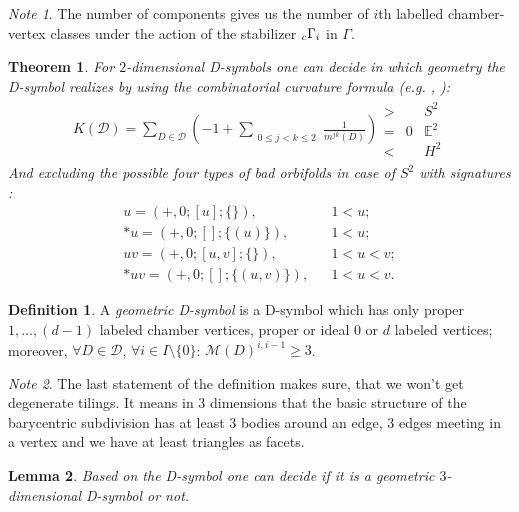 \documentclass[12pt,a4paper]{article}
\numberwithin{equation}{section}
\newcommand{\leftsub}[2]{{\vphantom{#2}}_{#1}{#2}}
\theoremstyle{plain}%
\newtheorem{thm}{Theorem}[section]
\newtheorem{lem}[thm]{Lemma}
\theoremstyle{definition}
\newtheorem{defn}{Definition}[section]
\theoremstyle{remark}
\newtheorem*{note}{Note}
\begin{document}
\begin{note}
  The number of components gives us the number of $i$th labelled chamber-vertex
  classes under the action of the stabilizer $\leftsub{c}{\Gamma}_i$ in $\Gamma$.
\end{note}

\begin{thm}
  \label{thm:curvature}
  For $2$-dimensional D-symbols one can decide in which geometry the
  D-symbol realizes by using the {\em combinatorial curvature formula}
  (e.g. \cite{M96}, \cite{LMS94}):
  \begin{align*}
    K(\mathcal{D})=\sum_{D\in
    \mathcal{D}}\left(-1+\sum_{\substack{0\le j<k\le 2}}\frac{1}{m^{jk}(D)}\right)
    \begin{array}{cccc}
      > & & S^2 \\
      = & 0 & \mathbb{E}^2 \\
      < & & H^2
    \end{array}
  \end{align*}
  And excluding the possible four types of bad orbifolds in case of $S^2$ with 
  signatures \cite{Ma67}:
  \begin{align*}
    u=(+,0;[u];\{\}), & & 1<u;\\
    *u=(+,0;[];\{(u)\}), & & 1<u;\\
    uv=(+,0;[u,v];\{\}), & & 1<u<v;\\
    *uv=(+,0;[];\{(u,v)\}), & & 1<u<v.
  \end{align*}
\end{thm}

\begin{defn}
  \label{def:D-sym}
  A {\em geometric D-symbol} is a D-symbol which
  has only proper $1,\ldots,(d-1)$ labeled chamber vertices, proper or ideal $0$ or
  $d$ labeled vertices; moreover, $\forall D\in \mathcal{D}$, $\forall i\in
  I\setminus\{0\}$: $\mathcal{M}(D)^{i,i-1}\geq3$.
\end{defn}

\begin{note}
  The last statement of the definition makes sure, that we won't get degenerate
  tilings. It means in $3$ dimensions that the basic structure of the barycentric
  subdivision has at least 3 bodies around an edge, 3 edges meeting in a
  vertex and we have at least triangles as facets.
\end{note}

\begin{lem}
  Based on the D-symbol one can decide if it is a geometric $3$-dimensional
  D-symbol or not.
\end{lem}
\end{document}
